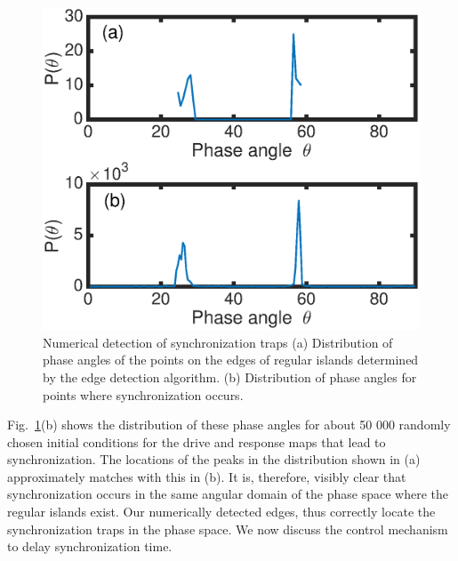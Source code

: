 \documentclass[preprint,showpacs,preprintnumbers,amsmath,amssymb]{revtex4-1}
\begin{document}
\begin{figure}[h]
\includegraphics[scale=0.6]{Edge_Sync_angles}
\caption{\label{fig:Edge_Sync_angles} \footnotesize Numerical detection of 
synchronization traps (a) Distribution of phase 
angles of the points on the edges of regular islands determined by the edge 
detection algorithm. (b) Distribution of phase angles for points where 
synchronization occurs. }
\end{figure}

Fig.~\ref{fig:Edge_Sync_angles}(b) shows the distribution of these phase angles for about 50 000 randomly chosen initial conditions for the drive and response maps that lead to synchronization. The locations of the peaks in the distribution shown in (a) approximately matches with this in (b). It is, therefore, visibly clear that synchronization occurs in the same angular domain of the phase space where the regular islands exist. Our numerically detected edges, thus correctly locate the synchronization traps in the phase space.  We now discuss the control mechanism to delay synchronization time. 
\end{document}
